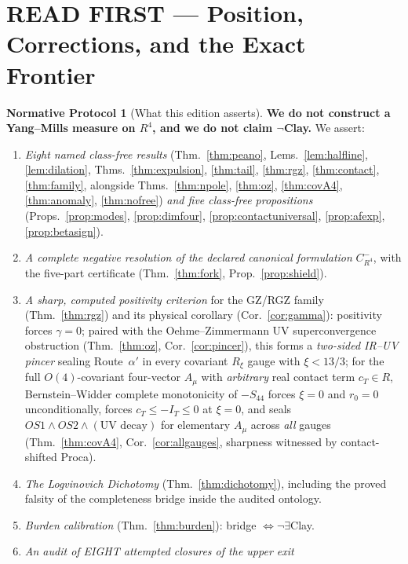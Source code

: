 \documentclass[11pt,a4paper]{article}
\def\R{R}\def\N{N}\def\Q{Q}\def\Z{Z}\def\Class{C}\def\OS{OS}\def\Gap{Gap}%
\theoremstyle{plain}
\theoremstyle{definition}
\newtheorem{protocol}[theorem]{Normative Protocol}
\theoremstyle{remark}
\newcommand{\R}{\mathbb{R}}\newcommand{\N}{\mathbb{N}}\newcommand{\Q}{\mathbb{Q}}
\newcommand{\Z}{\mathbb{Z}}\newcommand{\Spec}{\operatorname{Spec}}
\newcommand{\OS}{\mathrm{OS}}\newcommand{\Gap}{\mathrm{Gap}}
\newcommand{\Class}{\mathcal{C}}\newcommand{\Htot}{\mathcal{H}}
\renewcommand{\_}{\oldunderscore\allowbreak}
\begin{document}
\section*{\color{darkred}READ FIRST --- Position, Corrections, and the Exact Frontier}
\begin{protocol}[What this edition asserts]\label{prot:position}
\textbf{We do not construct a Yang--Mills measure on $\R^4$, and we do not claim $\neg$Clay.}
We assert:
\begin{enumerate}[label=(\arabic*),leftmargin=22pt,itemsep=1pt]
\item \emph{Eight named class-free results} (Thm.~\ref{thm:peano}, Lems.~\ref{lem:halfline},
\ref{lem:dilation}, Thms.~\ref{thm:expulsion}, \ref{thm:tail}, \ref{thm:rgz}, \ref{thm:contact},
\ref{thm:family}, alongside Thms.~\ref{thm:npole}, \ref{thm:oz}, \ref{thm:covA4}, \ref{thm:anomaly}, \ref{thm:nofree})
\emph{and five class-free propositions}
(Props.~\ref{prop:modes}, \ref{prop:dimfour}, \ref{prop:contactuniversal}, \ref{prop:afexp}, \ref{prop:betasign}).
\item \emph{A complete negative resolution of the declared canonical formulation}
$\Class^-_{\R^4}$, with the five-part certificate (Thm.~\ref{thm:fork}, Prop.~\ref{prop:shield}).
\item \emph{A sharp, computed positivity criterion} for the GZ/RGZ family
(Thm.~\ref{thm:rgz}) and its physical corollary (Cor.~\ref{cor:gamma}): positivity forces
$\gamma=0$; paired with the Oehme--Zimmermann UV superconvergence obstruction
(Thm.~\ref{thm:oz}, Cor.~\ref{cor:pincer}), this forms a \emph{two-sided IR--UV pincer}
sealing Route~$\alpha'$ in every covariant $R_\xi$ gauge with $\xi<13/3$; for the full $O(4)$-covariant four-vector $A_\mu$ with \emph{arbitrary} real contact term $c_T\in\R$, Bernstein--Widder complete monotonicity of $-S_{44}$ forces $\xi=0$ and $r_0=0$ unconditionally, forces $c_T\le -I_T\le 0$ at $\xi=0$, and seals $\OS1\wedge\OS2\wedge(\text{UV decay})$ for elementary $A_\mu$ across \emph{all} gauges (Thm.~\ref{thm:covA4}, Cor.~\ref{cor:allgauges}, sharpness witnessed by contact-shifted Proca).
\item \emph{The Logvinovich Dichotomy} (Thm.~\ref{thm:dichotomy}), including the proved falsity
of the completeness bridge inside the audited ontology.
\item \emph{Burden calibration} (Thm.~\ref{thm:burden}): bridge $\iff\neg\exists$Clay.
\item \emph{An audit of EIGHT attempted closures of the upper exit}

\end{enumerate}
\end{protocol}
\end{document}
